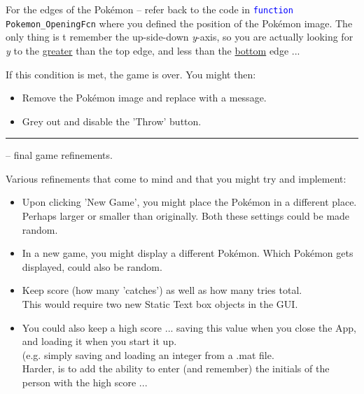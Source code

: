 \documentclass{tufte-book} %
\begin{document}
For the edges of the Pok\'emon -- refer back to the code in \texttt{\textcolor{blue}{function} Pokemon\_OpeningFcn} where you defined the position of the Pok\'emon image. The only thing is t remember the up-side-down \textit{y}-axis, so you are actually looking for \textit{y} to the \uline{greater} than the top edge, and less than the \uline{bottom} edge ...

If this condition is met, the game is over. You might then:
\begin{itemize}[noitemsep]
\setlength{\itemindent}{.2in}
\item Remove the Pok\'emon image and replace with a message.
\item Grey out and disable the 'Throw' button.
\end{itemize}

\vspace{1mm}
\noindent\rule{4cm}{0.5pt}
\vspace{-2mm}

 -- final game refinements.

Various refinements that come to mind and that you might try and implement:

\begin{itemize}[noitemsep]
\item Upon clicking 'New Game', you might place the Pok\'emon in a different place. Perhaps larger or smaller than originally. Both these settings could be made random.
\item In a new game, you might display a different Pok\'emon. Which Pok\'emon gets displayed, could also be random.
\item Keep score (how many 'catches') as well as how many tries total.
\\This would require two new \textsf{Static Text} box objects in the GUI.
\item You could also keep a high score ... saving this value when you close the App, and loading it when you start it up.
\\(e.g. simply saving and loading an integer from a \textsf{.mat} file.
\\Harder, is to add the ability to enter (and remember) the initials of the person with the high score ...
\end{itemize}

%
\end{document}
